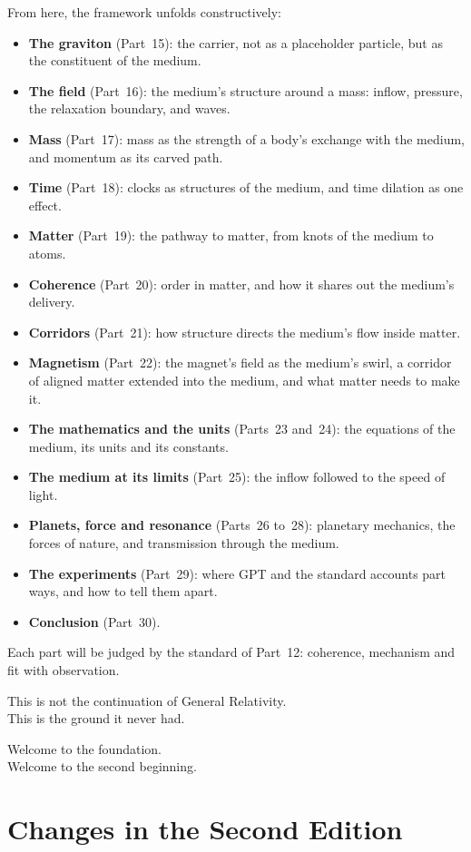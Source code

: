 \documentclass[11pt,a4paper]{article}
\begin{document}
From here, the framework unfolds constructively:
\begin{itemize}
\item \textbf{The graviton} (Part~15): the carrier, not as a placeholder particle, but as the constituent of the medium.
\item \textbf{The field} (Part~16): the medium's structure around a mass: inflow, pressure, the relaxation boundary, and waves.
\item \textbf{Mass} (Part~17): mass as the strength of a body's exchange with the medium, and momentum as its carved path.
\item \textbf{Time} (Part~18): clocks as structures of the medium, and time dilation as one effect.
\item \textbf{Matter} (Part~19): the pathway to matter, from knots of the medium to atoms.
\item \textbf{Coherence} (Part~20): order in matter, and how it shares out the medium's delivery.
\item \textbf{Corridors} (Part~21): how structure directs the medium's flow inside matter.
\item \textbf{Magnetism} (Part~22): the magnet's field as the medium's swirl, a corridor of aligned matter extended into the medium, and what matter needs to make it.
\item \textbf{The mathematics and the units} (Parts~23 and~24): the equations of the medium, its units and its constants.
\item \textbf{The medium at its limits} (Part~25): the inflow followed to the speed of light.
\item \textbf{Planets, force and resonance} (Parts~26 to~28): planetary mechanics, the forces of nature, and transmission through the medium.
\item \textbf{The experiments} (Part~29): where GPT and the standard accounts part ways, and how to tell them apart.
\item \textbf{Conclusion} (Part~30).
\end{itemize}
Each part will be judged by the standard of Part~12: coherence, mechanism and fit with observation.

This is not the continuation of General Relativity.\\
This is the ground it never had.

Welcome to the foundation.\\
Welcome to the second beginning.

\clearpage
\section*{Changes in the Second Edition}
\end{document}
